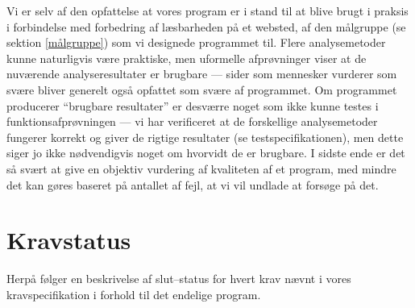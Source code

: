 \documentclass[a4paper,oneside]{memoir}
\begin{document}
Vi er selv af den opfattelse at vores program er i stand til at blive
brugt i praksis i forbindelse med forbedring af læsbarheden på et
websted, af den målgruppe (se sektion \ref{målgruppe}) som vi
designede programmet til. Flere analysemetoder kunne naturligvis være
praktiske, men uformelle afprøvninger viser at de nuværende
analyseresultater er brugbare --- sider som mennesker vurderer som
svære bliver generelt også opfattet som svære af programmet. Om
programmet producerer ``brugbare resultater'' er desværre noget som
ikke kunne testes i funktionsafprøvningen --- vi har verificeret at de
forskellige analysemetoder fungerer korrekt og giver de rigtige
resultater (se testspecifikationen), men dette siger jo ikke
nødvendigvis noget om hvorvidt de er brugbare. I sidste ende er det så
svært at give en objektiv vurdering af kvaliteten af et program, med
mindre det kan gøres baseret på antallet af fejl, at vi vil undlade at
forsøge på det.

\section{Kravstatus}
\label{kravstatus}
Herpå følger en beskrivelse af slut--status for hvert krav nævnt i
vores kravspecifikation i forhold til det endelige program.
\end{document}
